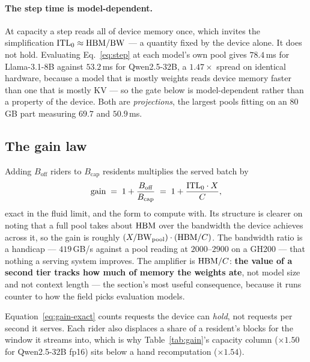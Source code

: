 \paragraph{The step time is model-dependent.}
\label{sec:model:modeldep}
At capacity a step reads all of device memory once, which invites the
simplification $\mathrm{ITL}_0 \approx \mathrm{HBM}/\mathrm{BW}$ --- a quantity fixed by the device
alone. It does not hold. Evaluating Eq.~\ref{eq:step} at each model's own pool
gives $78.4$\,ms for Llama-3.1-8B against $53.2$\,ms for Qwen2.5-32B, a
$1.47\times$ spread on identical hardware, because a model that is mostly weights
reads device memory faster than one that is mostly KV --- so the gate below is
model-dependent rather than a property of the device. Both are
\emph{projections}, the largest pools fitting on an 80\,GB part measuring $69.7$
and $50.9$\,ms.

\subsection{The gain law}
\label{sec:model:gain}

Adding $B_{\mathrm{off}}$ riders to $B_{\mathrm{cap}}$ residents multiplies the
served batch by
%
\begin{equation}
\label{eq:gain-exact}
\text{gain} \;=\; 1 + \frac{B_{\mathrm{off}}}{B_{\mathrm{cap}}}
      \;=\; 1 + \frac{\mathrm{ITL}_0 \cdot X}{C},
\end{equation}
%
exact in the fluid limit, and the form to compute with. Its structure is clearer on
noting that a full pool takes about $\mathrm{HBM}$ over the bandwidth the device achieves
across it, so the gain is roughly $(X/\mathrm{BW}_{\mathrm{pool}})\cdot(\mathrm{HBM}/C)$.
The bandwidth ratio is a handicap --- $419$\,GB/s against a pool reading at
$2000$--$2900$ on a GH200 --- that nothing a serving system improves. The amplifier
is $\mathrm{HBM}/C$: \textbf{the value of a second tier tracks how much of memory the
weights ate}, not model size and not context length --- the section's most useful
consequence, because it runs counter to how the field picks evaluation models.

Equation~\ref{eq:gain-exact} counts requests the device can \emph{hold}, not
requests per second it serves. Each rider also displaces a share of a resident's
blocks for the window it streams into, which is why Table~\ref{tab:gain}'s
capacity column ($\times1.50$ for Qwen2.5-32B fp16) sits below a hand
recomputation ($\times1.54$).

